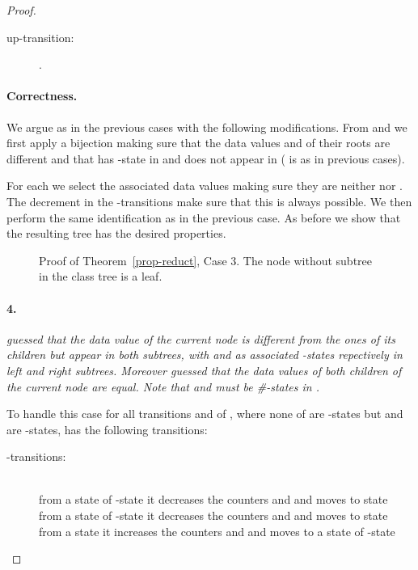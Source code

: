 \documentclass{CSML}
\begin{document}
\begin{proof}
\begin{description}
\item[\rm up-transition:]
.
\end{description}

\paragraph{\bf Correctness.}  
We argue as in the previous cases with the following modifications.
From  and  we first apply a bijection making sure that the
data values  and  of their roots are different and that  has
-state  in  
and  does not appear in  ( is as in previous cases).

For each  we select the associated data values making sure
they are neither  nor . The decrement in the -transitions make sure
that this is always possible. We then perform the same identification as in the
previous case. 
As before we show that the resulting tree  has the desired properties.

\begin{figure}
\small

\caption{Proof of Theorem~\ref{prop-reduct}, Case 3. The node without subtree in the class tree  is a leaf.}
\label{fig-reduct3}
\end{figure}








\paragraph{\bf 4.} 
\emph{ guessed that the data value  of the
  current node is different from the ones of its children but appear in both
  subtrees, with  and  as associated -states repectively in left and right subtrees. 
  Moreover  guessed that the data values of both children of the current node 
  are equal. Note that  and  must be \#-states in .}

\noindent
To handle this case for all transitions 
and  of
, where none of  are -states but
 and   are -states,  has the following transitions:
\begin{description}
\item[\rm -transitions:]\quad\\
from a state  of -state  
it decreases the counters  and  
and moves to state \\
from a state  of -state  it
decreases the counters  and  
and moves to state \\
from a state  
it increases the counters  and  
and moves to a state  of -state 


\end{description}
\end{proof}
\end{document}
